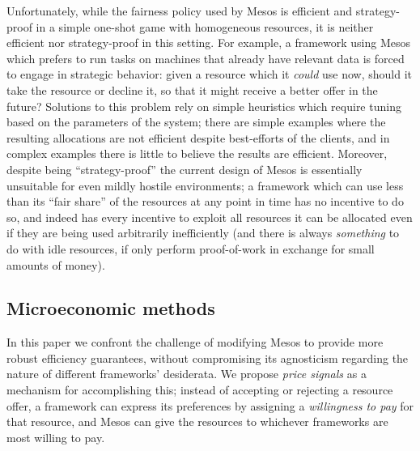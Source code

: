 \documentclass{acm_proc_article-sp}
\begin{document}
Unfortunately, while the fairness policy used by Mesos is efficient and
strategy-proof in a simple one-shot game with homogeneous resources, it is
neither efficient nor strategy-proof in this setting. For example, a framework
using Mesos which prefers to run tasks on machines that already have relevant
data is forced to engage in strategic behavior: given a resource which it
\emph{could} use now, should it take the resource or decline it, so that it
might receive a better offer in the future? Solutions to this problem rely on
simple heuristics which require tuning based on the parameters of the system;
there are simple examples where the resulting allocations are not efficient
despite best-efforts of the clients, and in complex examples there is little to
believe the results are efficient. Moreover, despite being ``strategy-proof'' the
current design of Mesos is essentially unsuitable for even mildly hostile
environments; a framework which can use less than its ``fair share'' of the
resources at any point in time has no incentive to do so, and indeed has every
incentive to exploit all resources it can be allocated even if they are being
used arbitrarily inefficiently (and there is always \emph{something} to do with
idle resources, if only perform proof-of-work in exchange for small amounts of
money).

\subsection{Microeconomic methods}
In this paper we confront the challenge of modifying Mesos to provide more
robust efficiency guarantees, without compromising its agnosticism regarding the
nature of different frameworks' desiderata. We propose \emph{price signals} as a
mechanism for accomplishing this; instead of accepting or rejecting a resource
offer, a framework can express its preferences by assigning a \emph{willingness
to pay} for that resource, and Mesos can give the resources to whichever
frameworks are most willing to pay.
\end{document}
